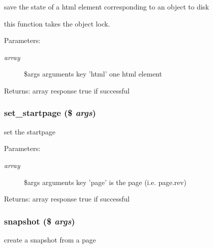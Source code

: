 save the state of a html element corresponding to an object to disk

this function takes the object lock. \begin{Desc}
\item[Parameters:]
\begin{description}
\item[{\em array}]\$args arguments key 'html' one html element \end{description}
\end{Desc}
\begin{Desc}
\item[Returns:]array response true if successful \end{Desc}
\hypertarget{module__glue_8inc_8php_afa7a8fa046ff6119cb7506d68edf787}{
\subsubsection[{set\_\-startpage}]{\setlength{\rightskip}{0pt plus 5cm}set\_\-startpage (\$ {\em args})}}
\label{module__glue_8inc_8php_afa7a8fa046ff6119cb7506d68edf787}


set the startpage

\begin{Desc}
\item[Parameters:]
\begin{description}
\item[{\em array}]\$args arguments key 'page' is the page (i.e. page.rev) \end{description}
\end{Desc}
\begin{Desc}
\item[Returns:]array response true if successful \end{Desc}
\hypertarget{module__glue_8inc_8php_5d3ad02088eee566589cd47fe0dc889a}{
\subsubsection[{snapshot}]{\setlength{\rightskip}{0pt plus 5cm}snapshot (\$ {\em args})}}
\label{module__glue_8inc_8php_5d3ad02088eee566589cd47fe0dc889a}


create a snapshot from a page

